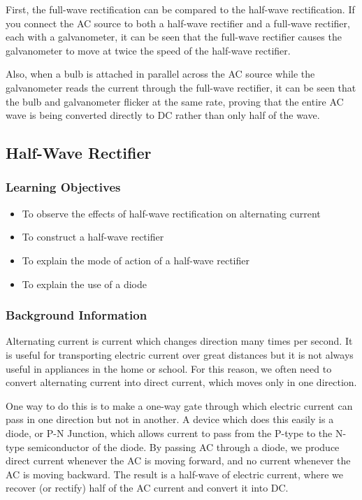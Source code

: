 First, the full-wave rectification can be compared to the half-wave rectification.  If you connect the AC source to both a half-wave rectifier and a full-wave rectifier, each with a galvanometer, it can be seen that the full-wave rectifier causes the galvanometer to move at twice the speed of the half-wave rectifier.

Also, when a bulb is attached in parallel across the AC source while the galvanometer reads the current through the full-wave rectifier, it can be seen that the bulb and galvanometer flicker at the same rate, proving that the entire AC wave is being converted directly to DC rather than only half of the wave.

\subsection{Half-Wave Rectifier}

\subsubsection*{Learning Objectives}
\begin{itemize}
\item{To observe the effects of half-wave rectification on alternating current}
\item{To construct a half-wave rectifier}
\item{To explain the mode of action of a half-wave rectifier}
\item{To explain the use of a diode}
\end{itemize}

\subsubsection*{Background Information}
Alternating current is current which changes direction many times per second.  It is useful for transporting electric current over great distances but it is not always useful in appliances in the home or school.  For this reason, we often need to convert alternating current into direct current, which moves only in one direction.

One way to do this is to make a one-way gate through which electric current can pass in one direction but not in another.  A device which does this easily is a diode, or P-N Junction, which allows current to pass from the P-type to the N-type semiconductor of the diode.  By passing AC through a diode, we produce direct current whenever the AC is moving forward, and no current whenever the AC is moving backward.  The result is a half-wave of electric current, where we recover (or rectify) half of the AC current and convert it into DC.

